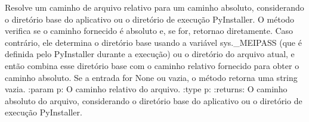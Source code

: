 \documentclass[letterpaper,10pt,english]{sphinxmanual}
\begin{document}
\begin{fulllineitems}
\label{\detokenize{api/license_dialog:license_dialog.abs_path}}
\pysigstartsignatures
\pysiglinewithargsret
{}
{}
{}
\pysigstopsignatures
\sphinxAtStartPar
Resolve um caminho de arquivo relativo para um caminho absoluto, considerando o diretório base do aplicativo ou o diretório de execução PyInstaller. O método verifica se o caminho fornecido é absoluto e, se for, retorna\sphinxhyphen{}o diretamente. Caso contrário, ele determina o diretório base usando a variável sys.\_MEIPASS (que é definida pelo PyInstaller durante a execução) ou o diretório do arquivo atual, e então combina esse diretório base com o caminho relativo fornecido para obter o caminho absoluto. Se a entrada for None ou vazia, o método retorna uma string vazia.
:param p: O caminho relativo do arquivo.
:type p: 
:returns: O caminho absoluto do arquivo, considerando o diretório base do aplicativo ou o diretório de execução PyInstaller.
\begin{quote}\begin{description}
\sphinxAtStartPar
{}

\end{description}\end{quote}

\end{fulllineitems}

\end{document}
